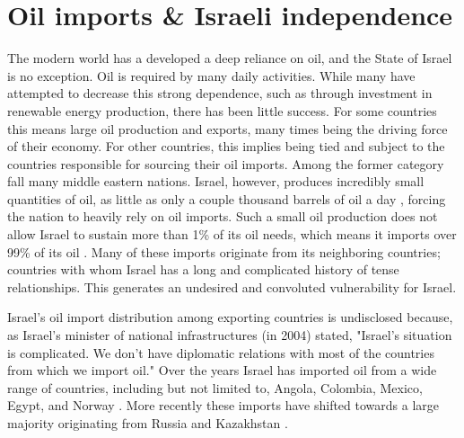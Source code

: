 \documentclass{report}                         %
\begin{document}

\section{Oil imports \& Israeli independence}
The modern world has a developed a deep reliance on oil, and the State of Israel is no exception. Oil is required by many daily activities. While many have attempted to decrease this strong dependence, such as through investment in renewable energy production, there has been little success. For some countries this means large oil production and exports, many times being the driving force of their economy. For other countries, this implies being tied and subject to the countries responsible for sourcing their oil imports. Among the former category fall many middle eastern nations. Israel, however, produces incredibly small quantities of oil, as little as only a couple thousand barrels of oil a day \cite{Engber2006WhereOil}, forcing the nation to heavily rely on oil imports. Such a small oil production does not allow Israel to sustain more than 1\% of its oil needs, which means it imports over 99\% of its oil \cite{Engber2006WhereOil}. Many of these imports originate from its neighboring countries; countries with whom Israel has a long and complicated history of tense relationships. This generates an undesired and convoluted vulnerability for Israel.
    
Israel's oil import distribution among exporting countries is undisclosed because, as Israel's minister of national infrastructures (in 2004) stated, "Israel's situation is complicated. We don't have diplomatic relations with most of the countries from which we import oil." \cite{Engber2006WhereOil} Over the years Israel has imported oil from a wide range of countries, including but not limited to, Angola, Colombia, Mexico, Egypt, and Norway \cite{Engber2006WhereOil}. More recently these imports have shifted towards a large majority originating from Russia and Kazakhstan \cite{Engber2006WhereOil}. 
	
\end{document}
